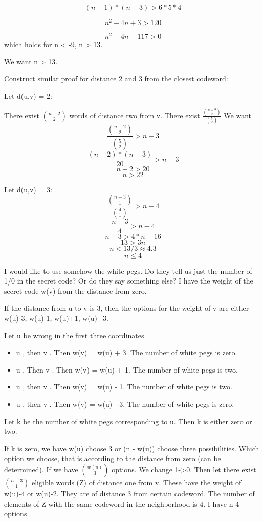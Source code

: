 \[(n-1)*(n-3) > 6*5*4\]

\[
n^2-4n+3 > 120
\]

\[
n^2-4n-117 > 0
\]
which holds for n < -9, n > 13. 

We want n > 13. 

Construct similar proof for distance 2 and 3 from the closest codeword:

Let d(u,v) = 2:

There exist $\binom{n-2}{2}$ words of distance two from v. There exist $\frac{\binom{n-2}{2}}{\binom{5}{2}}$
We want 
\[
\frac{\binom{n-2}{2}}{\binom{5}{2}} > n-3
\]
\[\frac{(n-2)*(n-3)}{20} > n-3\]
\[n-2 > 20\]
\[n > 22\]

Let d(u,v) = 3:
\[\frac{\binom{n-3}{1}}{\binom{4}{1}} > n-4\]
\[\frac{n-3}{4} > n-4\]
\[n-3 > 4*n-16\]
\[13 > 3n\]
\[n < 13/3 \approx 4.3\]
\[n \leq 4\]

I would like to use somehow the white pegs. Do they tell us just the number of 1/0 in the secret code? Or do they say something else? I have the weight of the secret code w(v) from the distance from zero. 

If the distance from u to v is 3, then the options for the weight of v are either w(u)-3, w(u)-1, w(u)+1, w(u)+3. 

Let u be wrong in the first three coordinates. 

\begin{itemize}
    \item u , then v . Then w(v) = w(u) + 3. The number of white pegs is zero. 
    \item u , Then v . Then w(v) = w(u) + 1. The number of white pegs is two.
    \item u , then v . Then w(v) = w(u) - 1. The number of white pegs is two. 
    \item u , then v . Then w(v) = w(u) - 3. The number of white pegs is zero. 
\end{itemize}

Let k be the number of white pegs corresponding to u. Then k is either zero or two. 

If k is zero, we have w(u) choose 3 or (n - w(u)) choose three possibilities. Which option we choose, that is according to the distance from zero (can be determined). If we have $\binom{w(u)}{3}$ options. We change 1->0. Then let there exist $\binom{n-3}{1}$ eligible words (Z) of distance one from v. These have the weight of w(u)-4 or w(u)-2. They are of distance 3 from certain codeword. The number of elements of Z with the same codeword in the neighborhood is 4. I have n-4 options 

